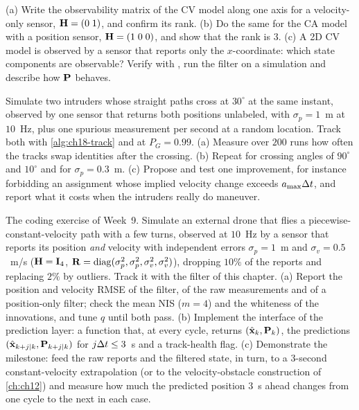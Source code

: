 \begin{exercise}[\difficulty{2}]
\label{exr:ch18-observability}
(a) Write the observability matrix of the CV model along one axis for a
velocity-only sensor, $\mathbf{H}=(0\;1)$, and confirm its rank. (b) Do the same
for the CA model with a position sensor, $\mathbf{H}=(1\;0\;0)$, and show that
the rank is $3$. (c) A 2D CV model is observed by a sensor that reports only
the $x$-coordinate: which state components are observable? Verify with
, run the filter on a simulation and describe how
$\mathbf{P}$ behaves.
\end{exercise}

\begin{exercise}
\label{exr:ch18-association}
Simulate two intruders whose straight paths cross at $30^\circ$ at the same
instant, observed by one sensor that returns both positions unlabeled, with
$\sigma_p=1$~m at $10$~Hz, plus one spurious measurement per second at a
random location. Track both with \cref{alg:ch18-track} and
 at $P_G=0.99$. (a) Measure over
$200$ runs how often the tracks swap identities after the crossing. (b)
Repeat for crossing angles of $90^\circ$ and $10^\circ$ and for
$\sigma_p=0.3$~m. (c) Propose and test one improvement, for instance
forbidding an assignment whose implied velocity change exceeds $a_{\max}\Delta t$,
and report what it costs when the intruders really do maneuver.
\end{exercise}

\begin{exercise}
\label{exr:ch18-coding}
The coding exercise of Week~9. Simulate an external drone that flies a
piecewise-constant-velocity path with a few turns, observed at $10$~Hz by a
sensor that reports its position \emph{and} velocity with independent errors
$\sigma_p=1$~m and $\sigma_v=0.5$~m/s ($\mathbf{H}=\mathbf{I}_4$,
$\mathbf{R}=\operatorname{diag}(\sigma_p^2,\sigma_p^2,\sigma_v^2,\sigma_v^2)$), dropping
$10\%$ of the reports and replacing $2\%$ by outliers. Track it with the
filter of this chapter. (a) Report the position and velocity RMSE of the
filter, of the raw measurements and of a position-only filter; check the mean
NIS ($m=4$) and the whiteness of the innovations, and tune $q$ until both
pass. (b) Implement the interface of the prediction layer: a function that,
at every cycle, returns $(\hat{\mathbf{x}}_k,\mathbf{P}_k)$, the predictions
$(\hat{\mathbf{x}}_{k+j\mid k},\mathbf{P}_{k+j\mid k})$ for $j\Delta t\le3$~s and a
track-health flag. (c) Demonstrate the milestone: feed the raw reports and
the filtered state, in turn, to a $3$-second constant-velocity extrapolation
(or to the velocity-obstacle construction of \cref{ch:ch12}) and measure how
much the predicted position $3$~s ahead changes from one cycle to the next
in each case.
\end{exercise}

